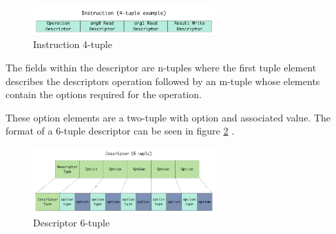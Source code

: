 \documentclass[journal]{IEEEtran}
\begin{document}
\begin{figure}[!t]
\centerline{
\mbox{\includegraphics[width=2.75in]{instructionTuple.jpg}}
}
\caption{Instruction 4-tuple}
\label{fig:instructionTuple}
\end{figure}

The fields within the descriptor are n-tuples where the first tuple element describes the descriptors operation followed by an m-tuple whose elements contain the options required for the operation.

These option elements are a two-tuple with option and associated value.
The format of a 6-tuple descriptor can be seen in figure \ref{fig:descriptorTuple} .

\begin{figure}[!t]
\centerline{
\mbox{\includegraphics[width=2.75in]{descriptorTuple.jpg}}
}
\caption{Descriptor 6-tuple}
\label{fig:descriptorTuple}
\end{figure}
\end{document}
